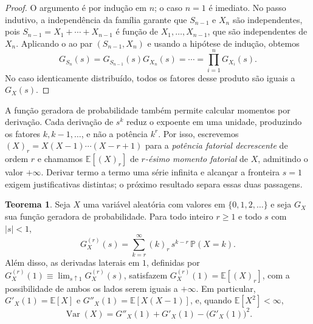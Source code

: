 \documentclass[12pt,portuguese]{article}
\theoremstyle{definition}
\newtheorem{theorem}{Teorema}
\theoremstyle{plainexercise}
\theoremstyle{starredexercise}
\theoremstyle{definition}
\begin{document}
\begin{proof}
O argumento é por indução em $n$; o caso $n=1$ é imediato. No passo
indutivo, a independência da família garante que
$S_{n-1}$ e $X_n$ são independentes, pois $S_{n-1}=X_1+\cdots+X_{n-1}$ é
função de $X_1,\ldots,X_{n-1}$, que são independentes de $X_n$. Aplicando
o  ao par $(S_{n-1},X_n)$ e usando a hipótese de
indução, obtemos
\[
G_{S_n}(s)
=G_{S_{n-1}}(s)G_{X_n}(s)
=\cdots
=\prod_{i=1}^{n}G_{X_i}(s).
\]
No caso identicamente distribuído, todos os fatores desse produto são
iguais a $G_X(s)$.
\end{proof}

\medskip

A função geradora de probabilidade também permite calcular momentos por derivação. Cada derivação de $s^k$
reduz o expoente em uma unidade, produzindo os fatores $k,k-1,\ldots$, e não a
potência $k^r$. Por isso, escrevemos $(X)_r=X(X-1)\cdots(X-r+1)$ para a
\emph{potência fatorial decrescente} de ordem $r$ e chamamos $\mathbb{E}[(X)_r]$
de \emph{$r$-ésimo momento fatorial} de $X$, admitindo o valor $+\infty$.
Derivar termo a termo uma série infinita e alcançar a fronteira $s=1$ exigem
justificativas distintas; o próximo resultado separa essas duas passagens.

\begin{theorem}\label{thm:fgp-momentos}
Seja $X$ uma variável aleatória com valores em $\{0,1,2,\ldots\}$ e seja $G_X$
sua função geradora de probabilidade. Para todo inteiro $r\geqslant 1$ e todo $s$ com $|s|<1$,
\[
G_X^{(r)}(s)=\sum_{k=r}^{\infty}(k)_r\,s^{k-r}\,\mathbb{P}(X=k).
\]
Além disso, as derivadas laterais em $1$, definidas por
$G_X^{(r)}(1)\equiv\lim_{s\uparrow 1}G_X^{(r)}(s)$, satisfazem
$G_X^{(r)}(1)=\mathbb{E}[(X)_r]$, com a possibilidade de ambos os lados serem
iguais a $+\infty$. Em particular, $G'_X(1)=\mathbb{E}[X]$ e
$G''_X(1)=\mathbb{E}[X(X-1)]$, e, quando $\mathbb{E}[X^2]<\infty$,
\[
\operatorname{Var}(X)=G''_X(1)+G'_X(1)-\bigl(G'_X(1)\bigr)^2.
\]
\end{theorem}
\end{document}
